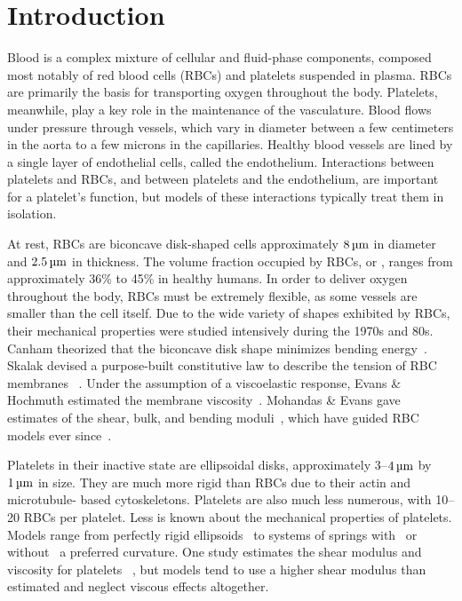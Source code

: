 \section{Introduction}

Blood is a complex mixture of cellular and fluid-phase components, composed most notably 
of red blood cells (RBCs) and platelets suspended in plasma. RBCs are primarily the basis
for transporting oxygen throughout the body. Platelets, meanwhile, play a key role in the
maintenance of the vasculature. Blood flows under pressure through vessels, which vary in
diameter between a few centimeters in the aorta to a few microns in the capillaries.
Healthy blood vessels are lined by a single layer of endothelial cells, called the
endothelium. Interactions between platelets and RBCs, and between platelets and the
endothelium, are important for a platelet's function, but models of these interactions
typically treat them in isolation.

At rest, RBCs are biconcave disk-shaped cells approximately $8\um$ in diameter and
$2.5\um$ in thickness. The volume fraction occupied by RBCs, or , ranges
from approximately 36\% to 45\% in healthy humans. In order to deliver oxygen throughout
the body, RBCs must be extremely flexible, as some vessels are smaller than the cell
itself. Due to the wide variety of shapes exhibited by RBCs, their mechanical properties
were studied intensively during the 1970s and 80s. Canham theorized that the biconcave
disk shape minimizes bending energy~\cite{Canham:1970wx}. Skalak  devised a
purpose-built constitutive law to describe the tension of RBC membranes~%
\cite{Skalak:1973tp}. Under the assumption of a viscoelastic response, Evans \& Hochmuth
estimated the membrane viscosity~\cite{Evans:1976tx}. Mohandas \& Evans gave estimates of
the shear, bulk, and bending moduli~\cite{Mohandas:1994tg}, which have guided RBC models
ever since~\cite{Pozrikidis:2003ft,Fai:2013do}.

Platelets in their inactive state are ellipsoidal disks, approximately 3--$4\um$ by
$1\um$ in size. They are much more rigid than RBCs due to their actin and microtubule-%
based cytoskeletons. Platelets are also much less numerous, with 10--20 RBCs per
platelet. Less is known about the mechanical properties of platelets. Models range from
perfectly rigid ellipsoids~\cite{Wang:2013gs} to systems of springs with~%
\cite{Erickson:2010ep,Skorczewski:2013jn} or without~\cite{Wu:2014gt} a preferred
curvature. One study estimates the shear modulus and viscosity for platelets~%
\cite{Haga:1998wa}, but models tend to use a higher shear modulus than estimated and
neglect viscous effects altogether.

